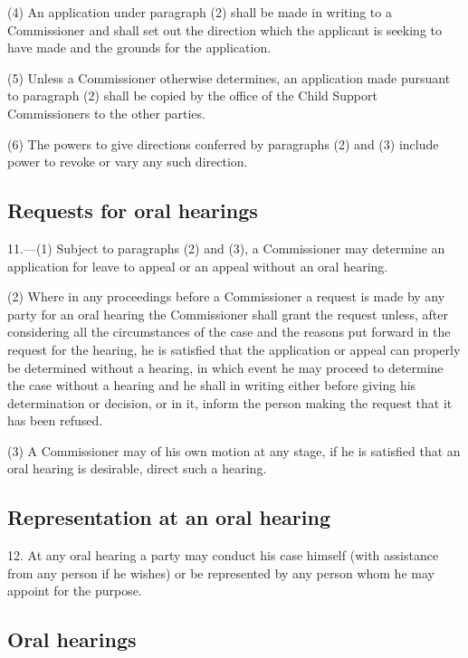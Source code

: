 \documentclass[a4paper]{article}
\begin{document}
(4) An application under paragraph (2) shall be made in writing to a Commissioner and shall set out the direction which the applicant is seeking to have made and the grounds for the application.

(5) Unless a Commissioner otherwise determines, an application made pursuant to paragraph (2) shall be copied by the office of the Child Support Commissioners to the other parties.

(6) The powers to give directions conferred by paragraphs (2) and (3) include power to revoke or vary any such direction.

\subsection[11. Requests for oral hearings]{Requests for oral hearings}

11.—(1) Subject to paragraphs (2) and (3), a Commissioner may determine an application for leave to appeal or an appeal without an oral hearing.

(2) Where in any proceedings before a Commissioner a request is made by any party for an oral hearing the Commissioner shall grant the request unless, after considering all the circumstances of the case and the reasons put forward in the request for the hearing, he is satisfied that the application or appeal can properly be determined without a hearing, in which event he may proceed to determine the case without a hearing and he shall in writing either before giving his determination or decision, or in it, inform the person making the request that it has been refused.

(3) A Commissioner may of his own motion at any stage, if he is satisfied that an oral hearing is desirable, direct such a hearing.

\subsection[12. Representation at an oral hearing]{Representation at an oral hearing}

12.  At any oral hearing a party may conduct his case himself (with assistance from any person if he wishes) or be represented by any person whom he may appoint for the purpose.

\subsection[13. Oral hearings]{Oral hearings}
\end{document}
